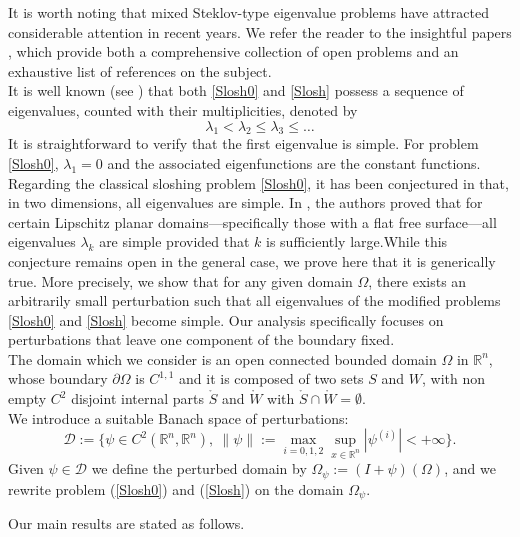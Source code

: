 \documentclass[a4paper,reqno,11pt,oneside]{amsart}
\theoremstyle{plain}
\theoremstyle{plain}
\theoremstyle{plain}
\theoremstyle{remark}
\begin{document}
It is worth noting that mixed Steklov-type eigenvalue problems have attracted considerable attention in recent years. We refer the reader to the insightful papers \cite{cggs,gp1,gipo}, which provide both a comprehensive collection of open problems and an exhaustive list of references on the subject.\\

It is well known (see \cite{agra, gipo}) that both \eqref{Slosh0} and \eqref{Slosh} possess a sequence of eigenvalues, counted with their multiplicities, denoted by$$  \lambda_1 < \lambda_2 \le \lambda_3 \le \dots$$It is straightforward to verify that the first eigenvalue is simple. For problem \eqref{Slosh0}, $\lambda_1 = 0$ and the associated eigenfunctions are the constant functions.
Regarding the classical sloshing problem \eqref{Slosh0}, it has been conjectured in \cite{kkm, gp1} that, in two dimensions, all eigenvalues are simple. In \cite{lpps}, the authors proved that for certain Lipschitz planar domains—specifically those with a flat free surface—all eigenvalues $\lambda_k$ are simple provided that $k$ is sufficiently large.While this conjecture remains open in the general case, we prove here that it is generically true. More precisely, we show that for any given domain $\Omega$, there exists an arbitrarily small perturbation such that all eigenvalues of the modified problems \eqref{Slosh0} and \eqref{Slosh} become simple. Our analysis specifically focuses on perturbations that leave one component of the boundary fixed.\\

The domain which we consider is an open connected bounded domain $\Omega$ in $\mathbb{R}^n$, whose boundary $\partial \Omega $ is $C^{1,1}$ and it is composed of two sets $S$ and $W$, with non empty $C^2$ disjoint internal parts  $\mathring S$ and $\mathring W$ with  $\mathring S\cap\mathring W=\emptyset$. \\
We introduce  a suitable Banach space of perturbations:
$$ \mathcal{D}:=\{\psi\in C^2(\mathbb{R}^n,\mathbb{R}^n),\ \|\psi\|:=\max_{i=0,1,2}\sup_{x\in\mathbb{R}^n}|\psi^{(i)}|<+\infty\}.$$
Given $\psi\in \mathcal{D}$  we define the perturbed domain by $\Omega_\psi := (I+\psi)(\Omega)$, and we rewrite  problem (\ref{Slosh0}) and  (\ref{Slosh}) on the domain $\Omega_\psi$.

 



Our main results are stated as follows.
\end{document}
